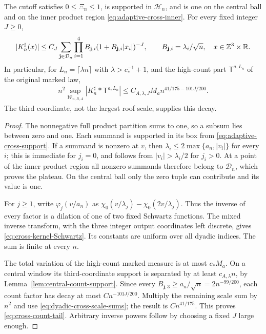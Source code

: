 \begin{lemma}
\label{lem:cross-kernel-tail}
The cutoff satisfies $0\le\Xi_n\le1$, is supported in
$\mathcal H_n$, and is one on the central ball and on the inner
product region \eqref{eq:adaptive-cross-inner}. For every fixed
integer $J\ge0$,
\begin{equation}\label{eq:cross-kernel-Schwartz}
 |K_n^\sharp(x)|\le C_J\sum_{\mathbf j\in\mathcal D_n}
     \prod_{i=1}^4 B_{\mathbf j,i}
          (1+B_{\mathbf j,i}|x_i|)^{-J},\qquad
 B_{\mathbf j,i}=\lambda_i/\sqrt n,
 \quad x\in\Z^3\times\R.
\end{equation}
In particular, for $L_n=\lceil\lambda n\rceil$ with
$\lambda>c_*^{-1}+1$, and the high-count part
$\mathsf T^{a,L_n}$ of the original marked law,
\begin{align}
 n^2\sup_{\mathcal W_{n,R,A}}
        |K_n^\sharp*\mathsf T^{a,L_n}|
 \le C_{A,\lambda,J}M_a n^{41/175-101J/200}.
 \label{eq:cross-count-tail}
\end{align}
The third coordinate, not the largest roof scale, supplies this decay.
\end{lemma}
\begin{proof}
The nonnegative full product partition sums to one, so a subsum lies
between zero and one. Each summand is supported in its box from
\eqref{eq:adaptive-cross-support}. If a summand is nonzero at $v$,
then $\lambda_i\le2\max\{a_n,|v_i|\}$ for every $i$; this is
immediate for $j_i=0$, and follows from
$|v_i|>\lambda_i/2$ for $j_i>0$. At a point of the inner product
region all nonzero summands therefore belong to $\mathcal D_n$,
which proves the plateau. On the central ball only the zero tuple
can contribute and its value is one.

For $j\ge1$, write $\varphi_j(v/a_n)$ as
$\chi_0(v/\lambda_j)-\chi_0(2v/\lambda_j)$. Thus the inverse of
every factor is a dilation of one of two fixed Schwartz functions.
The mixed inverse transform, with the three integer output coordinates
left discrete, gives \eqref{eq:cross-kernel-Schwartz}. Its constants
are uniform over all dyadic indices. The sum is finite at every $n$.

The total variation of the high-count marked measure is at most
$c_*M_a$. On a central window its third-coordinate support is
separated by at least $c_{A,\lambda}n$, by
Lemma~\ref{lem:central-count-support}. Since every
$B_{\mathbf j,3}\ge a_n/\sqrt n=2n^{-99/200}$, each count factor
has decay at most $C n^{-101J/200}$. Multiply the remaining scale
sum by $n^2$ and use \eqref{eq:dyadic-cross-scale-sums}; the result is
$Cn^{41/175}$. This proves \eqref{eq:cross-count-tail}. Arbitrary
inverse powers follow by choosing a fixed $J$ large enough.
\end{proof}

